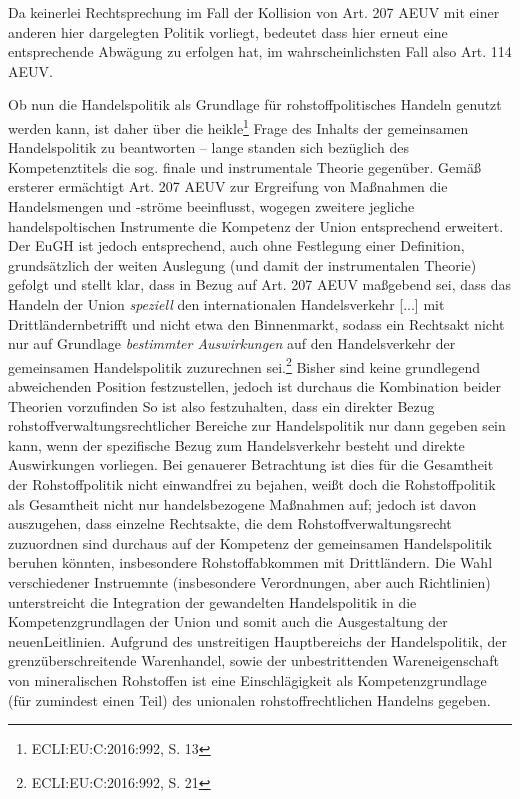 \documentclass[12pt,a4paper,oneside]{book} %
\begin{document}
Da keinerlei Rechtsprechung im Fall der Kollision von Art. 207 AEUV mit einer anderen hier dargelegten Politik vorliegt, bedeutet dass hier erneut eine entsprechende Abwägung zu erfolgen hat, im wahrscheinlichsten Fall also Art. 114 AEUV.
	
Ob nun die Handelspolitik als Grundlage für rohstoffpolitisches Handeln genutzt werden kann, ist daher über die \glqq heikle\grqq \footnote{ECLI:EU:C:2016:992, S. 13} Frage des Inhalts der gemeinsamen Handelspolitik zu beantworten -- lange standen sich bezüglich des Kompetenztitels die sog. finale und instrumentale Theorie gegenüber. Gemäß ersterer ermächtigt Art. 207 AEUV zur Ergreifung von Maßnahmen die Handelsmengen und -ströme beeinflusst, wogegen zweitere jegliche handelspoltischen Instrumente die Kompetenz der Union entsprechend erweitert.\autocite{Callies/Ruffert, Art. 207, Rn. 11} Der EuGH ist jedoch entsprechend, auch ohne Festlegung einer Definition, grundsätzlich der weiten Auslegung (und damit der instrumentalen Theorie) gefolgt und stellt klar, dass in Bezug auf Art. 207 AEUV maßgebend sei, dass das \glqq Handeln der Union \textit{speziell} den internationalen Handelsverkehr [...] mit Drittländern\grqq betrifft und nicht etwa den Binnenmarkt, sodass ein Rechtsakt nicht nur auf Grundlage \textit{bestimmter Auswirkungen} auf den Handelsverkehr der gemeinsamen Handelspolitik zuzurechnen sei.\footnote{ECLI:EU:C:2016:992, S. 21}
Bisher sind  keine grundlegend abweichenden Position festzustellen, jedoch ist durchaus die Kombination beider Theorien vorzufinden\autocites{Callies/Ruffert, Art. 207, Rn. 11}{Müller-Ibold, in: Lenz/Borchardt (Hrsg.), EU-Verträge, Vorb. zu Art. 206, Rn. 4;}{Weiß, in: Grabitz/Hilf/Nettesheim, EU, Art. 207, Rn. 69.}
So ist also festzuhalten, dass ein direkter Bezug rohstoffverwaltungsrechtlicher Bereiche zur Handelspolitik nur dann gegeben sein kann, wenn der spezifische Bezug zum Handelsverkehr besteht und direkte Auswirkungen vorliegen. Bei genauerer Betrachtung ist dies für die Gesamtheit der Rohstoffpolitik nicht einwandfrei zu bejahen, weißt doch die Rohstoffpolitik als Gesamtheit nicht nur handelsbezogene Maßnahmen auf; jedoch ist davon auszugehen, dass einzelne Rechtsakte, die dem Rohstoffverwaltungsrecht zuzuordnen sind durchaus auf der Kompetenz der gemeinsamen Handelspolitik beruhen könnten, insbesondere Rohstoffabkommen mit Drittländern. Die Wahl verschiedener Instruemnte (insbesondere Verordnungen, aber auch Richtlinien) unterstreicht die Integration der gewandelten Handelspolitik in die Kompetenzgrundlagen der Union und somit auch die Ausgestaltung der \glqq neuen\grqq Leitlinien.\autocite{RdTW 2024, 216}
Aufgrund des unstreitigen Hauptbereichs der Handelspolitik, der grenzüberschreitende Warenhandel, sowie der unbestrittenden Wareneigenschaft von mineralischen Rohstoffen ist eine Einschlägigkeit als Kompetenzgrundlage (für zumindest einen Teil) des unionalen rohstoffrechtlichen Handelns gegeben.
\end{document}
